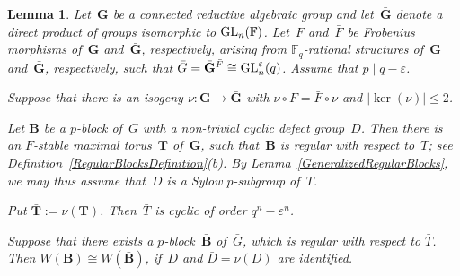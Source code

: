 \documentclass[12pt]{amsart}
\newcommand{\bG}{{\mathbf{G}}}      %
\newcommand{\bB}{{\mathbf{B}}}
\newcommand{\bT}{{\mathbf{T}}}
\def\GL{ \text{\rm GL} }
\newtheorem{lem}[thm]{Lemma}
\theoremstyle{theorem}
\theoremstyle{definition}
\theoremstyle{remark}
\begin{document}
\begin{lem}
\label{BlocksAndIsogeny}
Let~$\bG$ be a connected reductive algebraic group and let~$\bar{\bG}$ denote a 
direct product of groups isomorphic to $\GL_n( \mathbb{F} )$. Let~$F$ 
and~$\bar{F}$ be Frobenius morphisms of~$\bG$ and~$\bar{\bG}$, respectively, 
arising from $\mathbb{F}_q$-rational structures of~$\bG$ and~$\bar{\bG}$, 
respectively, such that
$\bar{G} = \bar{\bG}^{\bar{F}} \cong \GL_n^\varepsilon( q )$. 
Assume that $p \mid q - \varepsilon$.

Suppose that there is an isogeny $\nu : \bG \rightarrow \bar{\bG}$ with 
$\nu \circ F = \bar{F} \circ \nu$ and $|\!\ker(\nu)| \leq 2$.

Let $\bB$ be a $p$-block of~$G$ with a non-trivial cyclic defect group~$D$. Then 
there is an $F$-stable maximal torus~$\bT$ of~$\bG$, such that~$\bB$ is regular 
with respect to~$T$; see {\rm Definition~\ref{RegularBlocksDefinition}(b)}. By 
{\rm Lemma~\ref{GeneralizedRegularBlocks}},
we may thus assume that~$D$ is a Sylow $p$-subgroup of~$T$.

Put $\bar{\bT} := \nu( \bT )$. Then~$\bar{T}$ is cyclic of order 
$q^n - \varepsilon^n$.

Suppose that there exists a $p$-block~$\bar{\bB}$ of~$\bar{G}$, which is regular  
with respect to $\bar{T}$. Then $W( \bB ) \cong W( \bar{\bB} )$, if~$D$ 
and $\bar{D} = \nu(D)$ are identified.
\end{lem}
\end{document}
